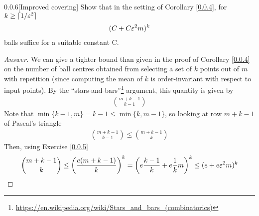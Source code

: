 \begin{ex}{0.0.6}[Improved covering]\label{0.0.6}
Show that in the setting of Corollary \ref{0.0.4}, for $k \geq \lceil 1/\varepsilon^2 \rceil$
\begin{align*}
    (C + C\varepsilon^2m)^k
\end{align*}
balls suffice for a suitable constant C.
\end{ex}

\begin{proof}[Answer] 
We can give a tighter bound than given in the proof of Corollary \ref{0.0.4} on the number of ball centres obtained from selecting a set of $k$ points out of $m$ with repetition
(since computing the mean of $k$ is order-invariant with respect to input points). By the ``stars-and-bars''\footnote{\url{https://en.wikipedia.org/wiki/Stars_and_bars_(combinatorics)}} argument, this quantity is given by
\begin{align*}
    \binom{m+k-1}{k -1}
\end{align*}
Note that $\min\{k-1, m\} = k - 1\leq \min\{k, m-1\}$, so looking at row $m+k-1$ of Pascal's triangle
\begin{align*}
    \binom{m+k-1} {k -1} \leq \binom{m+k-1}{k}
\end{align*}
Then, using Exercise \ref{0.0.5}
\begin{align*}
    \binom{m+k-1}{k} \leq \left(\frac {e (m+k-1)}{k}\right)^k = \left(e\frac{k-1}{k} + e\frac1k m\right)^k \leq (e + e\varepsilon^2m)^k
\end{align*}

\end{proof}
